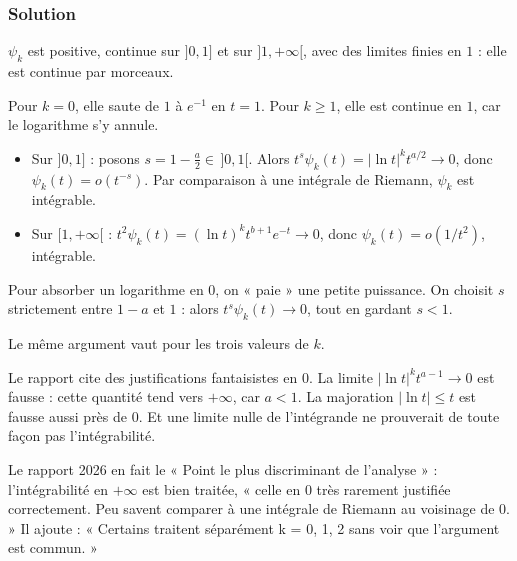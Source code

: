 \documentclass[11pt,a4paper]{article}
\providecommand{\tightlist}{\setlength{\itemsep}{0pt}\setlength{\parskip}{0pt}}
\newcommand{\equationajustee}[1]{%
  \sbox{\boiteequation}{$\displaystyle #1$}%
  \ifdim\wd\boiteequation>\linewidth
    \[\resizebox{\linewidth}{!}{\usebox{\boiteequation}}\]%
  \else
    \[#1\]%
  \fi}
\begin{document}
\hypertarget{solution-10}{%
\subsubsection{Solution}\label{solution-10}}

\(\psi_k\) est positive, continue sur \(]0,1]\) et sur \(]1,+\infty[\), avec des limites finies en \(1\) : elle est continue par morceaux.

Pour \(k=0\), elle saute de \(1\) à \(e^{-1}\) en \(t=1\). Pour \(k\ge1\), elle est continue en \(1\), car le logarithme s'y annule.

\begin{itemize}
\tightlist
\item
  Sur \(]0,1]\) : posons \(s=1-\frac a2\in\,]0,1[\). Alors \(t^s\psi_k(t)=|\ln t|^kt^{a/2}\to0\), donc \(\psi_k(t)=o(t^{-s})\). Par comparaison à une intégrale de Riemann, \(\psi_k\) est intégrable.
\item
  Sur \([1,+\infty[\) : \(t^2\psi_k(t)=(\ln t)^kt^{b+1}e^{-t}\to0\), donc \(\psi_k(t)=o(1/t^2)\), intégrable.
\end{itemize}

\equationajustee{\boxed{\psi_0,\ \psi_1,\ \psi_2\text{ sont \text{intégrables} sur }\mathbb R_+^*.}}

\begin{methode}

Pour absorber un logarithme en \(0\), on « paie » une petite puissance. On choisit \(s\) strictement entre \(1-a\) et \(1\) : alors \(t^s\psi_k(t)\to0\), tout en gardant \(s<1\).

Le même argument vaut pour les trois valeurs de \(k\).

\end{methode}

\begin{piege}

Le rapport cite des justifications fantaisistes en \(0\). La limite \(|\ln t|^kt^{a-1}\to0\) est fausse : cette quantité tend vers \(+\infty\), car \(a<1\). La majoration \(|\ln t|\le t\) est fausse aussi près de \(0\). Et une limite nulle de l'intégrande ne prouverait de toute façon pas l'intégrabilité.

\end{piege}

\begin{jury}

Le rapport 2026 en fait le « Point le plus discriminant de l'analyse » : l'intégrabilité en \(+\infty\) est bien traitée, « celle en 0 très rarement justifiée correctement. Peu savent comparer à une intégrale de Riemann au voisinage de 0. » Il ajoute : « Certains traitent séparément k = 0, 1, 2 sans voir que l'argument est commun. »

\end{jury}
\end{document}
